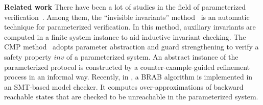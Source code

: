 \documentclass[conference]{IEEEtran}
\begin{document}
{{\bf Related work} There have been a lot of studies in the field of  parameterized
verification~\cite{Pnueli1996,Bjørner1997,Arons2001,Pnueli2001,Tiwari2001,McMillan2001,Chou2004,Pandav2005,Lv2007,cubicle2011,Conchon2013}.
Among them, the ``invisible invariants'' method~\cite{Arons2001}
is an automatic technique for parameterized verification. In this
method, auxiliary invariants are computed in a finite system
instance to aid inductive invariant checking.  %
The CMP method~\cite{Chou2004} adopts parameter abstraction and guard strengthening to verify a safety property $inv$ of
a parameterized system.
 An abstract instance of the parameterized protocol %
is constructed by a counter-example-guided refinement process in an  %
informal way. %
Recently, in \cite{Conchon2013}, a BRAB algorithm is implemented in an SMT-based model checker.  It computes over-approximations of
backward reachable states that are checked to be unreachable in the parameterized system.



}
\end{document}
